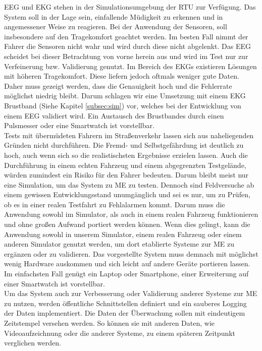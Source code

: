 {EEG und EKG stehen in der Simulationsumgebung der \acl{RTU} zur Verfügung. Das System soll in der Lage sein, einfallende Müdigkeit zu erkennen und in angemessener Weise zu reagieren. Bei der Anwendung der Sensoren, soll insbesondere auf den Tragekomfort geachtet werden. Im besten Fall nimmt der Fahrer die Sensoren nicht wahr und wird durch diese nicht abgelenkt. Das EEG scheidet bei dieser Betrachtung von vorne herein aus und wird im Test nur zur Verfeinerung bzw. Validierung genutzt. Im Bereich des EKGs existieren Lösungen mit höheren Tragekomfort. Diese liefern jedoch oftmals weniger gute Daten. Daher muss gezeigt werden, dass die Genauigkeit hoch und die Fehlerrate möglichst niedrig bleibt. 
Darum schlagen wir eine Umsetzung mit einem EKG Brustband (Siehe Kapitel \ref{subsec:sim}) vor, welches bei der Entwicklung von einem EEG validiert wird. Ein Austausch des Brustbandes durch einen Pulsmesser oder eine Smartwatch ist vorstellbar.\\

Tests mit übermüdeten Fahrern im Straßenverkehr lassen sich aus naheliegenden Gründen nicht durchführen. Die Fremd- und Selbstgefährdung ist deutlich zu hoch, auch wenn sich so die realistischsten Ergebnisse erzielen lassen. Auch die Durchführung in einem echten Fahrzeug und einem abgegrenzten Testgelände, würden zumindest ein Risiko für den Fahrer bedeuten. Darum bleibt meist nur eine Simulation, um das System zu \acl{ME} zu testen. 
Dennoch sind Feldversuche ab einem gewissen Entwicklungsstand unumgänglich und sei es nur, um zu Prüfen, ob es in einer realen Testfahrt zu Fehlalarmen kommt. Darum muss die Anwendung sowohl im Simulator, als auch in einem realen Fahrzeug funktionieren und ohne großen Aufwand portiert werden können. Wenn dies gelingt, kann die Anwendung sowohl in unserem Simulator, einem realen Fahrzeug oder einem anderen Simulator genutzt werden, um dort etablierte Systeme zur \acl{ME} zu ergänzen oder zu  validieren.
Das vorgestellte System muss demnach mit möglichst wenig Hardware auskommen und sich leicht auf andere Geräte portieren lassen. Im einfachsten Fall genügt ein Laptop oder Smartphone, einer Erweiterung auf einer Smartwatch ist vorstellbar.\\

Um das System auch zur Verbesserung oder Validierung anderer Systeme zur \acl{ME} zu nutzen, werden öffentliche Schnittstellen definiert und ein sauberes Logging der Daten implementiert. Die Daten der Überwachung sollen mit eindeutigem Zeitstempel versehen werden. So können sie mit anderen Daten, wie Videoaufzeichnung oder die anderer Systeme, zu einem späteren Zeitpunkt verglichen werden. 

}
